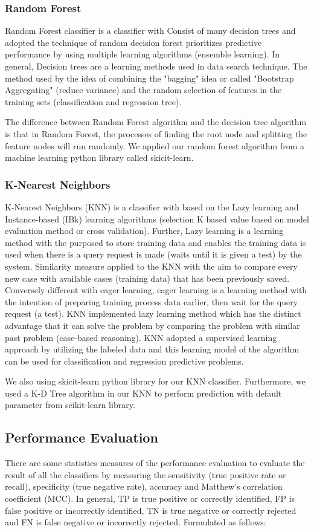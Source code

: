 \documentclass[10pt,twocolumn]{article}
\begin{document}
\subsubsection{Random Forest}
Random Forest classifier is a classifier with Consist of many decision trees and adopted the technique of random decision forest prioritizes predictive performance by using multiple learning algorithms (ensemble learning). In general, Decision trees are a learning methods used in data search technique. The method used by the idea of combining the "bagging" idea or called "Bootstrap Aggregating" (reduce variance) and the random selection of features in the training sets (classification and regression tree). 
\par
The difference between Random Forest algorithm and the decision tree algorithm is that in Random Forest, the processes of finding the root node and splitting the feature nodes will run randomly. We applied our random forest algorithm from a machine learning python library called skicit-learn\cite{pedregosa2011scikit}.
\subsubsection{K-Nearest Neighbors}
K-Nearest Neighbors (KNN) is a classifier with based on the Lazy learning and Instance-based (IBk) learning algorithms (selection K based value based on model evaluation method or cross validation). Further, Lazy learning is a learning method with the purposed to store training data and enables the training data is used when there is a query request is made (waits until it is given a test) by the system. Similarity measure applied to the KNN with the aim to compare every new case with available cases (training data) that has been previously saved. Conversely different with eager learning, eager learning is a learning method with the intention of preparing training process data earlier, then wait for the query request (a test). KNN implemented lazy learning method which has the distinct advantage that it can solve the problem by comparing the problem with similar past problem (case-based reasoning). KNN adopted a supervised learning approach by utilizing the labeled data and this learning model of the algorithm can be used for classification and regression predictive problems.
\par
We also using skicit-learn python library for our KNN classifier. Furthermore, we used a K-D Tree algorithm in our KNN to perform prediction with default parameter from scikit-learn library.
\subsection{Performance Evaluation}
There are some statistics measures of the performance evaluation to evaluate the result of all the classifiers by measuring the sensitivity (true positive rate or recall), specificity (true negative rate), accuracy and Matthew's correlation coefficient (MCC). In general, TP is true positive or correctly identified, FP is false positive or incorrectly identified, TN is true negative or correctly rejected and FN is false negative or incorrectly rejected. Formulated as follows:
\end{document}
